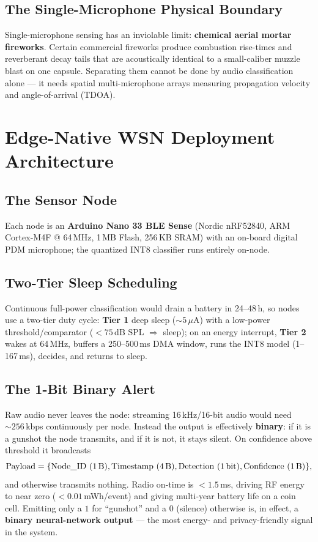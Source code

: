 \documentclass[conference]{IEEEtran}
\begin{document}
\subsection{The Single-Microphone Physical Boundary}
Single-microphone sensing has an inviolable limit: \textbf{chemical aerial mortar fireworks}. Certain
commercial fireworks produce combustion rise-times and reverberant decay tails that are acoustically
identical to a small-caliber muzzle blast on one capsule. Separating them cannot be done by audio
classification alone --- it needs spatial multi-microphone arrays measuring propagation velocity and
angle-of-arrival (TDOA).

\section{Edge-Native WSN Deployment Architecture}
\label{sec:wsn}
\subsection{The Sensor Node}
Each node is an \textbf{Arduino Nano 33 BLE Sense} (Nordic nRF52840, ARM Cortex-M4F @ 64\,MHz, 1\,MB Flash,
256\,KB SRAM) with an on-board digital PDM microphone; the quantized INT8 classifier runs entirely on-node.

\subsection{Two-Tier Sleep Scheduling}
Continuous full-power classification would drain a battery in 24--48\,h, so nodes use a two-tier duty cycle:
\textbf{Tier 1} deep sleep ($\sim 5\,\mu$A) with a low-power threshold/comparator ($< 75$\,dB SPL $\Rightarrow$
sleep); on an energy interrupt, \textbf{Tier 2} wakes at 64\,MHz, buffers a 250--500\,ms DMA window, runs the
INT8 model (1--167\,ms), decides, and returns to sleep.

\subsection{The 1-Bit Binary Alert}
Raw audio never leaves the node: streaming 16\,kHz/16-bit audio would need $\sim 256$\,kbps continuously per
node. Instead the output is effectively \textbf{binary}: if it is a gunshot the node transmits, and if it is
not, it stays silent. On confidence above threshold it broadcasts
\begin{equation}
    \text{Payload} = \{\text{Node\_ID (1\,B)}, \text{Timestamp (4\,B)}, \text{Detection (1\,bit)}, \text{Confidence (1\,B)}\},
\end{equation}
and otherwise transmits nothing. Radio on-time is $<1.5$\,ms, driving RF energy to near zero
($<0.01$\,mWh/event) and giving multi-year battery life on a coin cell. Emitting only a $1$ for ``gunshot''
and a $0$ (silence) otherwise is, in effect, a \textbf{binary neural-network output} --- the most energy- and
privacy-friendly signal in the system.
\end{document}
